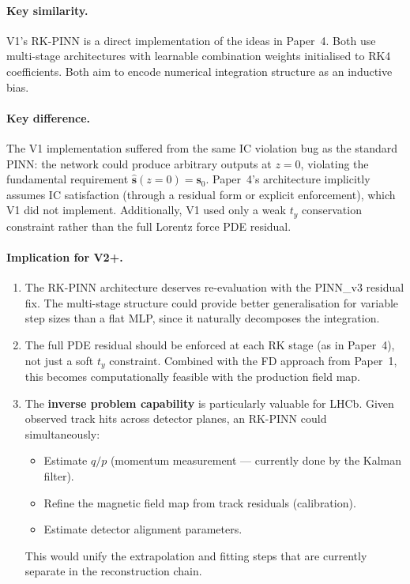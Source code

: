 \documentclass[12pt,a4paper]{article}
\newcommand{\vb}[1]{\bm{#1}}
\begin{document}
\paragraph{Key similarity.} V1's RK-PINN is a direct implementation of the ideas in Paper~4. Both use multi-stage architectures with learnable combination weights initialised to RK4 coefficients. Both aim to encode numerical integration structure as an inductive bias.

\paragraph{Key difference.} The V1 implementation suffered from the same IC violation bug as the standard PINN: the network could produce arbitrary outputs at $z = 0$, violating the fundamental requirement $\hat{\vb{s}}(z{=}0) = \vb{s}_0$. Paper~4's architecture implicitly assumes IC satisfaction (through a residual form or explicit enforcement), which V1 did not implement. Additionally, V1 used only a weak $t_y$ conservation constraint rather than the full Lorentz force PDE residual.

\paragraph{Implication for V2+.}
\begin{enumerate}
\item The RK-PINN architecture deserves re-evaluation with the PINN\_v3 residual fix. The multi-stage structure could provide better generalisation for variable step sizes than a flat MLP, since it naturally decomposes the integration.
\item The full PDE residual should be enforced at each RK stage (as in Paper~4), not just a soft $t_y$ constraint. Combined with the FD approach from Paper~1, this becomes computationally feasible with the production field map.
\item The \textbf{inverse problem capability} is particularly valuable for LHCb. Given observed track hits across detector planes, an RK-PINN could simultaneously:
    \begin{itemize}
    \item Estimate $q/p$ (momentum measurement --- currently done by the Kalman filter).
    \item Refine the magnetic field map from track residuals (calibration).
    \item Estimate detector alignment parameters.
    \end{itemize}
    This would unify the extrapolation and fitting steps that are currently separate in the reconstruction chain.
\end{enumerate}
\end{document}
